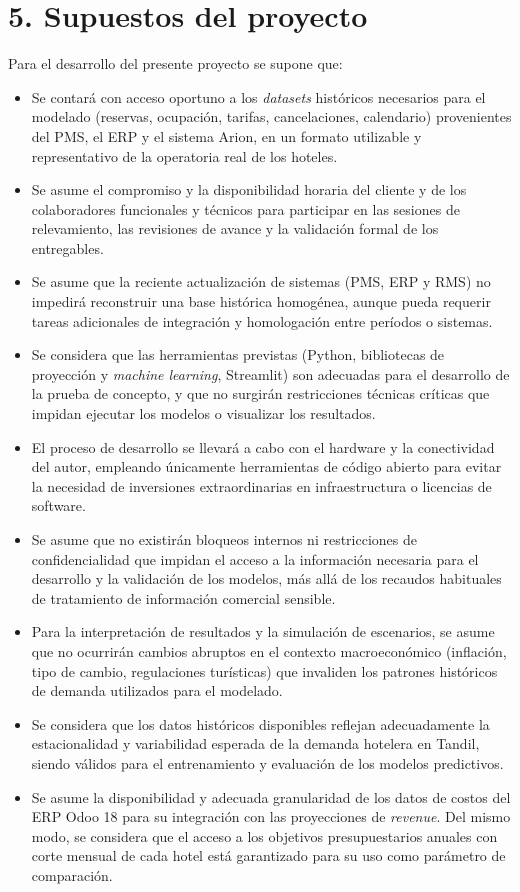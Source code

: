 \documentclass[
11pt, %
]{charter}
\begin{document}
\section{5. Supuestos del proyecto}
\label{sec:supuestos}

Para el desarrollo del presente proyecto se supone que:

\begin{itemize}
	\item Se contará con acceso oportuno a los \textit{datasets} históricos necesarios para el modelado (reservas, ocupación, tarifas, cancelaciones, calendario) provenientes del PMS, el ERP y el sistema Arion, en un formato utilizable y representativo de la operatoria real de los hoteles.
	\item Se asume el compromiso y la disponibilidad horaria del cliente y de los colaboradores funcionales y técnicos para participar en las sesiones de relevamiento, las revisiones de avance y la validación formal de los entregables.
	\item Se asume que la reciente actualización de sistemas (PMS, ERP y RMS) no impedirá reconstruir una base histórica homogénea, aunque pueda requerir tareas adicionales de integración y homologación entre períodos o sistemas.
	\item Se considera que las herramientas previstas (Python, bibliotecas de proyección y \textit{machine learning}, Streamlit) son adecuadas para el desarrollo de la prueba de concepto, y que no surgirán restricciones técnicas críticas que impidan ejecutar los modelos o visualizar los resultados.
	\item El proceso de desarrollo se llevará a cabo con el hardware y la conectividad del autor, empleando únicamente herramientas de código abierto para evitar la necesidad de inversiones extraordinarias en infraestructura o licencias de software.
	\item Se asume que no existirán bloqueos internos ni restricciones de confidencialidad que impidan el acceso a la información necesaria para el desarrollo y la validación de los modelos, más allá de los recaudos habituales de tratamiento de información comercial sensible.
	\item Para la interpretación de resultados y la simulación de escenarios, se asume que no ocurrirán cambios abruptos en el contexto macroeconómico (inflación, tipo de cambio, regulaciones turísticas) que invaliden los patrones históricos de demanda utilizados para el modelado.
	\item Se considera que los datos históricos disponibles reflejan adecuadamente la estacionalidad y variabilidad esperada de la demanda hotelera en Tandil, siendo válidos para el entrenamiento y evaluación de los modelos predictivos.
	\item Se asume la disponibilidad y adecuada granularidad de los datos de costos del ERP Odoo 18 para su integración con las proyecciones de \textit{revenue}. Del mismo modo, se considera que el acceso a los objetivos presupuestarios anuales con corte mensual de cada hotel está garantizado para su uso como parámetro de comparación.
\end{itemize}
\pagebreak
\end{document}

